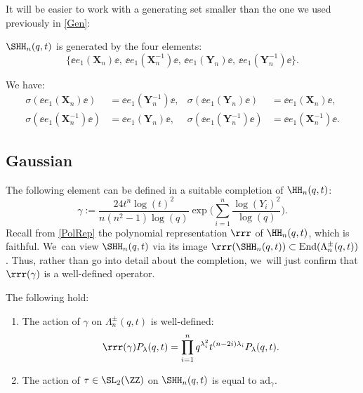 It will be easier to work with a generating set smaller than the one we used previously in \ref{Gen}:

\begin{lem}
$\SHH_n(q,t)$ is generated by the four elements:
\[
\bigl\{\ee e_1(\boldsymbol{X}_n)\ee,\,\ee e_1(\boldsymbol{X}_n^{-1})\ee,\,\ee e_1(\boldsymbol{Y}_n)\ee,\,\ee e_1(\boldsymbol{Y}_n^{-1})\ee \bigr\}.
\]
\end{lem}

\begin{prop}
We have:
\begin{align*}
\sigma(\ee e_1(\boldsymbol{X}_n)\ee)&=\ee e_1(\boldsymbol{Y}_n^{-1})\ee, &\sigma(\ee e_1(\boldsymbol{Y}_n)\ee)&=\ee e_1(\boldsymbol{X}_n)\ee,\\
\sigma(\ee e_1(\boldsymbol{X}_n^{-1})\ee)&=\ee e_1(\boldsymbol{Y}_n)\ee, &\sigma(\ee e_1(\boldsymbol{Y}_n^{- 1})\ee)&=\ee e_1(\boldsymbol{X}_n^{-1})\ee.
\end{align*}
\end{prop}

\subsection{Gaussian}
The following element can be defined in a suitable completion of $\HH_n(q,t)$:
\begin{equation*}
\gamma:=\frac{24t^n\log(t)^2}{n(n^2-1)\log(q)}\exp\biggl(\sum_{i=1}^n\frac{\log(Y_i)^2}{\log(q)} \biggr).
\end{equation*}
Recall from \ref{PolRep} the polynomial representation $\rrr$ of $\HH_n(q,t)$, which is faithful. We~can view $\SHH_n(q,t)$ via its image $\rrr(\SHH_n(q,t))\subset\mathrm{End}(\Lambda_n^\pm(q,t))$.
Thus, rather than go into detail about the completion, we~will just confirm that $\rrr(\gamma)$ is a well-defined operator.

\begin{prop}\label{GaussProp}
The following hold:
\begin{enumerate}
\item The action of $\gamma$ on $\Lambda_n^\pm(q,t)$ is well-defined:
\begin{equation}
\rrr(\gamma)P_\lambda(q,t)=\prod_{i=1}^nq^{\lambda_i^2}t^{(n-2i)\lambda_i}P_\lambda(q,t).
\label{GaussEigen}
\end{equation}
\item The action of $\tau\in \SL_2(\ZZ)$ on $\SHH_n(q,t)$ is equal to $\mathrm{ad}_\gamma$.
\end{enumerate}
\end{prop}

